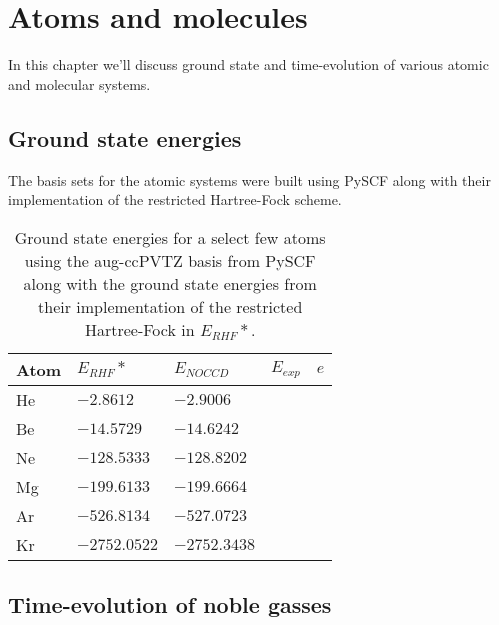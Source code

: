 \chapter{Atoms and molecules}
    In this chapter we'll discuss ground state and time-evolution of various
    atomic and molecular systems.

    \section{Ground state energies}
        The basis sets for the atomic systems were built using PySCF
        \cite{pyscf} along with their implementation of the restricted
        Hartree-Fock scheme.

        \begin{table}
            \centering
            \renewcommand{\arraystretch}{1.5}
            \begin{tabular}{@{}lllll@{}}
                \toprule
                Atom & $E_{RHF}*$ & $E_{NOCCD}$ & $E_{exp}$ & $e$ \\
                \midrule
                He & $-2.8612$    & $-2.9006$    & \\
                Be & $-14.5729$   & $-14.6242$   & \\
                Ne & $-128.5333$  & $-128.8202$  &\\
                Mg & $-199.6133$  & $-199.6664$  &\\
                Ar & $-526.8134$  & $-527.0723$  &\\
                Kr & $-2752.0522$ & $-2752.3438$ &\\
                \bottomrule
            \end{tabular}
            \caption{Ground state energies for a select few atoms using the
            aug-ccPVTZ basis from PySCF \cite{pyscf} along with the ground state
            energies from their implementation of the restricted Hartree-Fock in
            $E_{RHF}*$.}
            \label{tab:gs-atoms}
        \end{table}

    \section{Time-evolution of noble gasses}
